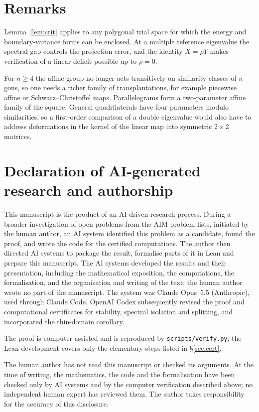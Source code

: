 \documentclass[11pt]{article}
\theoremstyle{definition}
\theoremstyle{remark}
\begin{document}
\section{Remarks}

Lemma~\ref{lem:crit} applies to any polygonal trial space for which the energy and boundary-variance forms
can be enclosed. At a multiple reference eigenvalue the spectral gap controls the projection error,
and the identity $X=\rho Y$ makes verification of a linear deficit possible up to $\rho=0$.

For $n\ge4$ the affine group no longer acts transitively on similarity classes of $n$-gons, so one needs
a richer family of transplantations, for example piecewise affine or Schwarz--Christoffel maps. Parallelograms form a two-parameter affine family of the square. General quadrilaterals
have four parameters modulo similarities, so a first-order comparison of a double eigenvalue would also
have to address deformations in the kernel of the linear map into symmetric $2\times2$ matrices.

\section*{Declaration of AI-generated research and authorship}
This manuscript is the product of an AI-driven research process. During a
broader investigation of open problems from the AIM problem lists, initiated
by the human author, an AI system identified this problem as a candidate,
found the proof, and wrote the code for the certified computations. The author
then directed AI systems to package the result, formalise parts of it in Lean
and prepare this manuscript. The AI systems developed the results and their
presentation, including the mathematical exposition, the computations, the
formalisation, and the organisation and writing of the text; the human author
wrote no part of the manuscript. The system was Claude Opus~5.5 (Anthropic),
used through Claude Code. OpenAI Codex subsequently revised the proof and computational certificates for
stability, spectral isolation and splitting, and incorporated the thin-domain corollary.

The proof is computer-assisted and is reproduced by \texttt{scripts/verify.py}; the Lean development covers
only the elementary steps listed in \S\ref{sec:cert}.

The human author has not read this manuscript or checked its arguments. At
the time of writing, the mathematics, the code and the formalisation have
been checked only by AI systems and by the computer verification described
above; no independent human expert has reviewed them. The author takes
responsibility for the accuracy of this disclosure.
\end{document}
